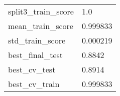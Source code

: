 \begin{tabular}{ll}
split3\_train\_score            &                                                1.0 \\
mean\_train\_score              &                                           0.999833 \\
std\_train\_score               &                                           0.000219 \\
best\_final\_test               &                                             0.8842 \\
best\_cv\_test                  &                                             0.8914 \\
best\_cv\_train                 &                                           0.999833 \\
\bottomrule
\end{tabular}
